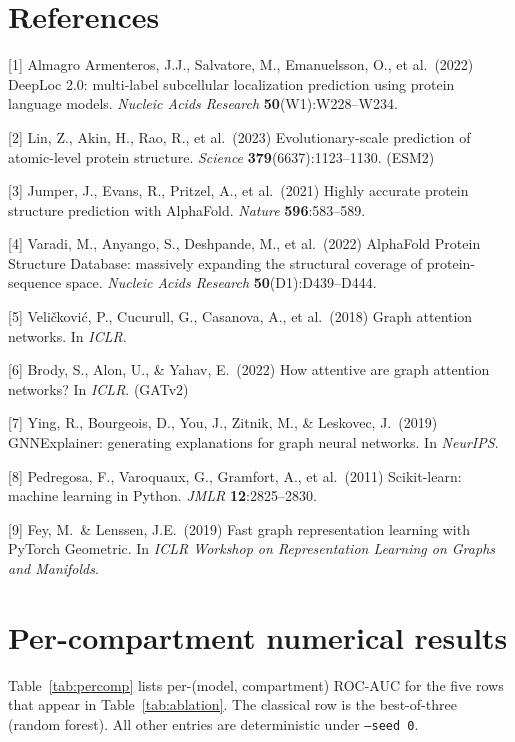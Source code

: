 \documentclass{article}
\begin{document}
\section*{References}
{\small
[1] Almagro Armenteros, J.J., Salvatore, M., Emanuelsson, O., et al.\ (2022)
DeepLoc 2.0: multi-label subcellular localization prediction using protein
language models. {\it Nucleic Acids Research} {\bf 50}(W1):W228--W234.

[2] Lin, Z., Akin, H., Rao, R., et al.\ (2023) Evolutionary-scale prediction of
atomic-level protein structure. {\it Science} {\bf 379}(6637):1123--1130. (ESM2)

[3] Jumper, J., Evans, R., Pritzel, A., et al.\ (2021) Highly accurate protein
structure prediction with AlphaFold. {\it Nature} {\bf 596}:583--589.

[4] Varadi, M., Anyango, S., Deshpande, M., et al.\ (2022) AlphaFold Protein
Structure Database: massively expanding the structural coverage of
protein-sequence space. {\it Nucleic Acids Research} {\bf 50}(D1):D439--D444.

[5] Veli\v{c}kovi\'{c}, P., Cucurull, G., Casanova, A., et al.\ (2018) Graph
attention networks. In {\it ICLR}.

[6] Brody, S., Alon, U., \& Yahav, E.\ (2022) How attentive are graph attention
networks? In {\it ICLR}. (GATv2)

[7] Ying, R., Bourgeois, D., You, J., Zitnik, M., \& Leskovec, J.\ (2019)
GNNExplainer: generating explanations for graph neural networks. In
{\it NeurIPS}.

[8] Pedregosa, F., Varoquaux, G., Gramfort, A., et al.\ (2011)
Scikit-learn: machine learning in Python. {\it JMLR} {\bf 12}:2825--2830.

[9] Fey, M.\ \& Lenssen, J.E.\ (2019) Fast graph representation learning with
PyTorch Geometric. In {\it ICLR Workshop on Representation Learning on Graphs
and Manifolds}.
}

\appendix

\section{Per-compartment numerical results}

Table~\ref{tab:percomp} lists per-(model, compartment) ROC-AUC for the
five rows that appear in Table~\ref{tab:ablation}. The classical row is
the best-of-three (random forest). All other entries are deterministic
under \texttt{--seed 0}.
\end{document}
